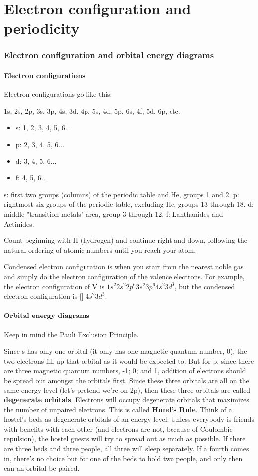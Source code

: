 \documentclass[letterpaper, 12pt]{article}
\begin{document}
\part{Electron configuration and periodicity}
\section{Electron configuration and orbital energy diagrams}
	\subsection{Electron configurations}
	Electron configurations go like this:

	1s, 2s, 2p, 3s, 3p, 4s, 3d, 4p, 5s, 4d, 5p, 6s, 4f, 5d, 6p, etc.

	\begin{itemize}
		\item s: 1, 2, 3, 4, 5, 6...
		\item p: 2, 3, 4, 5, 6...
		\item d: 3, 4, 5, 6...
		\item f: 4, 5, 6...
	\end{itemize}

	s: first two groups (columns) of the periodic table and He, groups 1 and 2.
	p: rightmost six groups of the periodic table, excluding He, groups 13 through 18.
	d: middle "transition metals" area, group 3 through 12.
	f: Lanthanides and Actinides.

	Count beginning with H (hydrogen) and continue right and down, following the natural ordering of atomic numbers until you reach your atom.

	Condensed electron configuration is when you start from the nearest noble gas and simply do the electron configuration of the valence electrons. For example, the electron configuration of V is $1s^2 2s^2 2p^6 3s^2 3p^6 4s^2 3d^3$, but the condensed electron configuration is [] $4s^2 3d^3$.

	\subsection{Orbital energy diagrams}
	Keep in mind the Pauli Exclusion Principle.

	Since s has only one orbital (it only has one magnetic quantum number, 0), the two electrons fill up that orbital as it would be expected to. But for p, since there are three magnetic quantum numbers, -1; 0; and 1, addition of electrons should be spread out amongst the orbitals first. Since these three orbitals are all on the same energy level (let's pretend we're on 2p), then these three orbitals are called \textbf{degenerate orbitals}. Electrons will occupy degenerate orbitals that maximizes the number of unpaired electrons. This is called \textbf{Hund's Rule}. Think of a hostel's beds as degenerate orbitals of an energy level. Unless everybody is friends with benefits with each other (and electrons are not, because of Coulombic repulsion), the hostel guests will try to spread out as much as possible. If there are three beds and three people, all three will sleep separately. If a fourth comes in, there's no choice but for one of the beds to hold two people, and only then can an orbital be paired.
\end{document}
